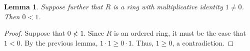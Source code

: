 \documentclass[12pt]{article}
\newtheorem{lem}{Lemma}
\begin{document}
\begin{lem}
Suppose further that $R$ is a ring with multiplicative identity $1 \neq 0$.  Then $0<1$.
\end{lem}

\begin{proof}
Suppose that $0 \not< 1$.  Since $R$ is an ordered ring, it must be the case that $1<0$.  By the previous lemma, $1 \cdot 1 \ge 0 \cdot 1$.  Thus, $1 \ge 0$, a contradiction.
\end{proof}
\end{document}
